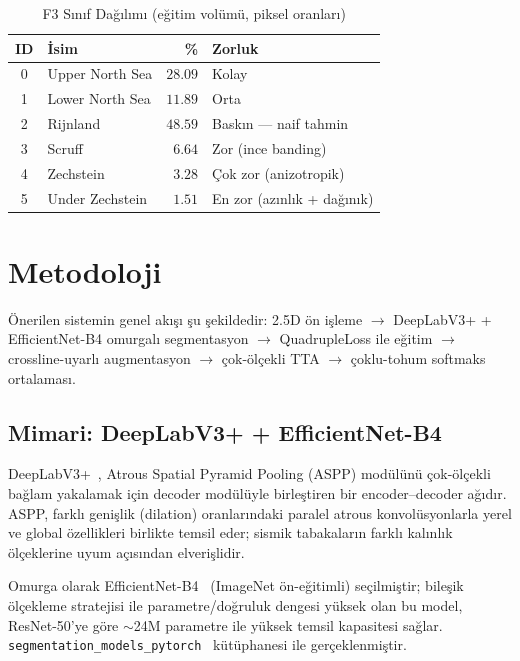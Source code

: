 \documentclass[conference,a4paper,10pt]{IEEEtran}
\begin{document}
\begin{table}[!t]
\renewcommand{\arraystretch}{1.2}
\caption{F3 Sınıf Dağılımı (eğitim volümü, piksel oranları)}
\label{tab:sinif_dagilim}
\centering
\begin{tabular}{clrl}
\toprule
\textbf{ID} & \textbf{İsim} & \textbf{\%} & \textbf{Zorluk} \\
\midrule
0 & Upper North Sea  & $28.09$ & Kolay \\
1 & Lower North Sea  & $11.89$ & Orta \\
2 & Rijnland         & $48.59$ & Baskın --- naif tahmin \\
3 & Scruff           & $\phantom{0}6.64$ & Zor (ince banding) \\
4 & Zechstein        & $\phantom{0}3.28$ & Çok zor (anizotropik) \\
5 & Under Zechstein  & $\phantom{0}1.51$ & En zor (azınlık + dağınık) \\
\bottomrule
\end{tabular}
\end{table}

\section{Metodoloji}
\label{sec:metod}

Önerilen sistemin genel akışı şu şekildedir: 2.5D ön işleme $\rightarrow$
DeepLabV3+ + EfficientNet-B4 omurgalı segmentasyon $\rightarrow$ QuadrupleLoss
ile eğitim $\rightarrow$ crossline-uyarlı augmentasyon $\rightarrow$ çok-ölçekli
TTA $\rightarrow$ çoklu-tohum softmaks ortalaması.

\subsection{Mimari: DeepLabV3+ + EfficientNet-B4}

DeepLabV3+~\cite{chen2018deeplabv3plus}, Atrous Spatial Pyramid Pooling (ASPP)
modülünü çok-ölçekli bağlam yakalamak için decoder modülüyle birleştiren bir
encoder--decoder ağıdır. ASPP, farklı genişlik (dilation) oranlarındaki paralel
atrous konvolüsyonlarla yerel ve global özellikleri birlikte temsil eder; sismik
tabakaların farklı kalınlık ölçeklerine uyum açısından elverişlidir.

Omurga olarak EfficientNet-B4~\cite{tan2019efficientnet} (ImageNet ön-eğitimli)
seçilmiştir; bileşik ölçekleme stratejisi ile parametre/doğruluk dengesi yüksek
olan bu model, ResNet-50'ye göre $\sim$24M parametre ile yüksek temsil kapasitesi
sağlar. \texttt{segmentation\_models\_pytorch}~\cite{Iakubovskii2019smp}
kütüphanesi ile gerçeklenmiştir.
\end{document}
